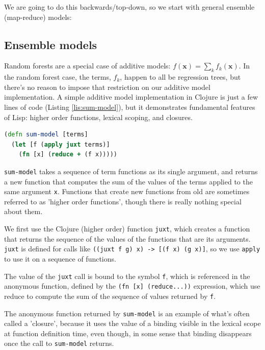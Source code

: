 \documentclass[11pt,openany,american,usenames,dvipsnames,svgnames,x11names,table,isodate]{article}
\numberwithin{equation}{section}
\numberwithin{figure}{section}
\begin{document}
We are going to do this backwards/top-down, so we start with general
ensemble (map-reduce) models:


\subsection{Ensemble models}

Random forests are a special case of additive models: 
$f(\mathbf{x})=\sum_{k}f_{k}(\mathbf{x})$.
In the random forest case, the terms, $f_{k}$, happen to all be regression
trees, but there's no reason to impose that restriction on our additive
model implementation. A simple additive model implementation in Clojure
is just a few lines of code (Listing \ref{lis:sum-model}), but it
demonstrates fundamental features of Lisp: higher order functions,
lexical scoping, and closures.

\begin{lstlisting}[caption={Sum additive model},label={lis:sum-model},language=clojure,tabsize=2]
(defn sum-model [terms] 
  (let [f (apply juxt terms)]
    (fn [x] (reduce + (f x)))))
\end{lstlisting}

\texttt{sum-model} takes a sequence of term functions as its single
argument, and returns a new function that computes the sum of the
values of the terms applied to the same argument \texttt{x}. Functions
that create new functions from old are sometimes referred to as 'higher
order functions', though there is really nothing special about them. 

We first use the Clojure (higher order) function \texttt{juxt}, which
creates a function that returns the sequence of the values of the
functions that are its arguments. \texttt{juxt} is defined for calls
like \texttt{((juxt~f~g)~x) -> {[}(f~x)~(g~x){]}}, so we use
\texttt{apply} to use it on a sequence of functions. 

The value of the \texttt{juxt} call is bound to the symbol \texttt{f},
which is referenced in the anonymous function, defined by the \texttt{(fn~{[}x{]}~(reduce...))}
expression, which use reduce to compute the sum of the sequence of
values returned by \texttt{f}.

The anonymous function returned by \texttt{sum-model} is an example
of what's often called a 'closure', because it uses the value of a
binding visible in the lexical scope at function definition time,
even though, in some sense that binding disappears once the call to
\texttt{sum-model} returns.
\end{document}
